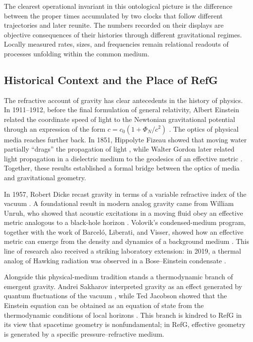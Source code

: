 \documentclass[11pt,a4paper]{article}
\begin{document}
The clearest operational invariant in this ontological picture is the difference between the proper times accumulated by two clocks that follow different trajectories and later reunite. The numbers recorded on their displays are objective consequences of their histories through different gravitational regimes. Locally measured rates, sizes, and frequencies remain relational readouts of processes unfolding within the common medium.

\subsection{Historical Context and the Place of RefG}

The refractive account of gravity has clear antecedents in the history of physics. In 1911--1912, before the final formulation of general relativity, Albert Einstein related the coordinate speed of light to the Newtonian gravitational potential through an expression of the form $c=c_0(1+\Phi_N/c^2)$ \citep{einstein1911,einstein1912}. The optics of physical media reaches further back. In 1851, Hippolyte Fizeau showed that moving water partially ``drags'' the propagation of light \citep{fizeau1851}, while Walter Gordon later related light propagation in a dielectric medium to the geodesics of an effective metric \citep{gordon1923}. Together, these results established a formal bridge between the optics of media and gravitational geometry.

In 1957, Robert Dicke recast gravity in terms of a variable refractive index of the vacuum \citep{dicke1957}. A foundational result in modern analog gravity came from William Unruh, who showed that acoustic excitations in a moving fluid obey an effective metric analogous to a black-hole horizon \citep{unruh1981}. Volovik's condensed-medium program, together with the work of Barcel\'o, Liberati, and Visser, showed how an effective metric can emerge from the density and dynamics of a background medium \citep{barcelo2011}. This line of research also received a striking laboratory extension: in 2019, a thermal analog of Hawking radiation was observed in a Bose--Einstein condensate \citep{munozdenova2019}.

Alongside this physical-medium tradition stands a thermodynamic branch of emergent gravity. Andrei Sakharov interpreted gravity as an effect generated by quantum fluctuations of the vacuum \citep{sakharov1967}, while Ted Jacobson showed that the Einstein equation can be obtained as an equation of state from the thermodynamic conditions of local horizons \citep{jacobson1995}. This branch is kindred to RefG in its view that spacetime geometry is nonfundamental; in RefG, effective geometry is generated by a specific pressure--refractive medium.
\end{document}
